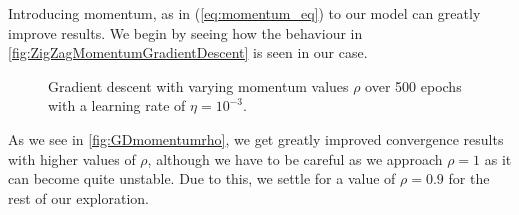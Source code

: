 \documentclass{article}
\theoremstyle{definition}
\begin{document}
Introducing momentum, as in (\ref{eq:momentum_eq}) to our model can greatly improve results. We begin by seeing how the behaviour in \autoref{fig:ZigZagMomentumGradientDescent} is seen in our case.

\begin{figure}[H]%
    \centering
    \qquad
    \caption{Gradient descent with varying momentum values $\rho$ over 500 epochs with a learning rate of $\eta = 10^{-3}$.}%
    \label{fig:GDmomentumrho}%
\end{figure}

As we see in \autoref{fig:GDmomentumrho}, we get greatly improved convergence results with higher values of $\rho$, although we have to be careful as we approach $\rho = 1$ as it can become quite unstable. Due to this, we settle for a value of $\rho = 0.9$ for the rest of our exploration.
\end{document}
